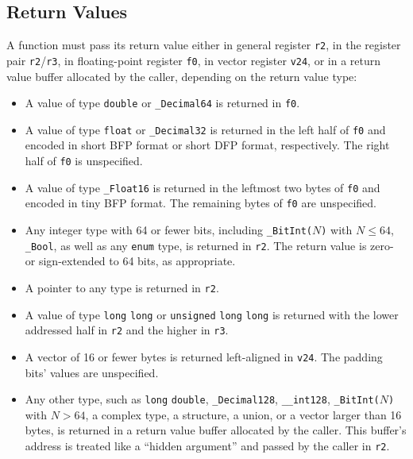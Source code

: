 \documentclass[USenglish,fontsize=11pt,twoside,%
  toc=bib,toc=idx,toc=graduated,numbers=noendperiod,
  bookmarks=true,
  bookmarksnumbered=true,
  bookmarksopen=true,
  bookmarksopenlevel=1,
  breaklinks=true,
  colorlinks=true,
  linkcolor=black,
  pdfpagelayout={TwoPageRight},
  pdfusetitle=true
]{scrreprt}
\newcommand{\NBITS}{64}
\newcommand{\NBITS}{32}
\begin{document}
\subsection{Return Values}
\label{retvalues}
A function must pass its return value either in general register
\texttt{r2},{\ifzseries\else{} in the register pair
  \texttt{r2}/\texttt{r3},\fi} in floating-point register \texttt{f0}, in
vector register \texttt{v24}, or in a return value buffer allocated by the
caller, depending on the return value type:

\begin{itemize}
\item A value of type \texttt{double} or \texttt{\_Decimal64} is returned
  in \texttt{f0}.
\item A value of type \texttt{float} or \texttt{\_Decimal32} is returned
  in the left half of \texttt{f0} and encoded in short BFP format or short
  DFP format, respectively.  The right half of \texttt{f0} is unspecified.
\item A value of type \texttt{\_Float16} is returned in the leftmost two
  bytes of \texttt{f0} and encoded in tiny BFP format.  The remaining
  bytes of \texttt{f0} are unspecified.
\item Any integer type with \NBITS{} or fewer bits, including
  \texttt{\_BitInt($N$)} with $N \le \NBITS{}$, \texttt{\_Bool}, as well as
  any \texttt{enum} type, is returned in \texttt{r2}.  The return value is
  zero- or sign-extended to \NBITS{} bits, as appropriate.
\item A pointer to any type is returned in \texttt{r2}.
  \ifzseries\else
\item A value of type \texttt{long} \texttt{long} or \texttt{unsigned}
  \texttt{long} \texttt{long} is returned with the lower addressed half in
  \texttt{r2} and the higher in \texttt{r3}.\fi
\item A vector of 16 or fewer bytes is returned left-aligned in
  \texttt{v24}.  The padding bits' values are unspecified.
\item Any other type, such as \texttt{long} \texttt{double},
  \texttt{\_Decimal128}, \texttt{\_\_int128}, \texttt{\_BitInt($N$)}
  with $N > \NBITS{}$, a complex type, a structure, a union, or a vector
  larger than 16 bytes, is returned in a return value buffer allocated by
  the caller.  This buffer's address is treated like a ``hidden argument''
  and passed by the caller in \texttt{r2}.
\end{itemize}
\end{document}
